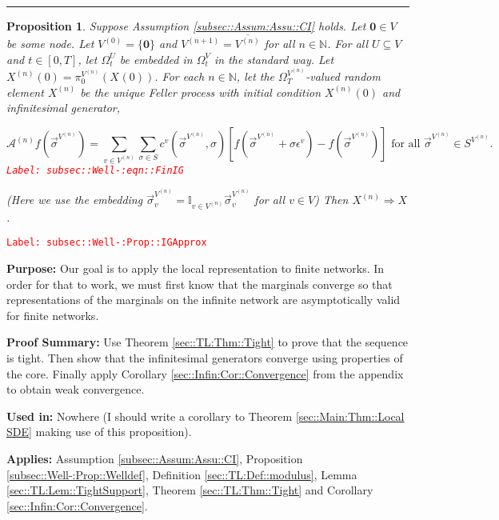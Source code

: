 \documentclass[12pt]{article}
\newcommand{\mb}{\mathbb}
\newcommand{\mc}{\mathcal}
\newcommand{\ov}{\overline}
\newcommand{\te}{\text}
\newcommand{\ep}{\epsilon}
\newcommand{\tr}{\textcolor{red}}
\newcommand{\labe}[1]{\tr{\texttt{Label: #1}}}
\newcommand{\purpose}{\textbf{Purpose: }}
\newcommand{\pfsum}{\textbf{Proof Summary: }}
\newcommand{\usein}{\textbf{Used in: }}
\newcommand{\app}{\textbf{Applies: }}
\newcommand{\lin}{\rule{\linewidth}{0.4 pt}}
\renewcommand{\root}{\mathbf{0}}				%
\renewcommand{\v}{v}							%
\renewcommand{\U}{U}							%
\renewcommand{\S}{S}							%
\newcommand{\s}{\sigma}							%
\newcommand{\sv}{\vec{\s}}						%
\newcommand{\ev}{\ep}							%
\newcommand{\T}{T}								%
\renewcommand{\t}{t}							%
\newcommand{\sset}{\Omega}						%
\newcommand{\proj}{\pi}							%
\newcommand{\X}{X}								%
\newcommand{\IG}{\mc{A}}						%
\newcommand{\IGr}{c}							%
\newcommand{\vind}[1]{^{#1}}					%
\newcommand{\carp}[1]{^{#1}}					%
\newcommand{\vsi}[1]{^{#1}}						%
\newcommand{\cind}[1]{_{#1}}					%
\newcommand{\cl}{\ov}							%
\newcommand{\tp}[1]{(#1)}						%
\newcommand{\tip}[1]{#1}						%
\newcommand{\ts}[1]{_{#1}}						%
\newcommand{\sln}[1]{^{(#1)}}					%
\newtheorem{prop}[thms]{Proposition}
\begin{document}
\lin

\begin{prop}
Suppose Assumption \ref{subsec::Assum:Assu::CI} holds. Let \(\root \in V\) be some node. Let \(V\sln{0} = \{\root\}\) and \(V\sln{n+1} = \cl{V\sln{n}}\) for all \(n \in \mb{N}\). For all \(\U \subseteq V\) and \(\t \in [0,\T]\), let \(\sset\vsi{\U}\ts{\t}\) be embedded in \(\sset\vsi{V}\ts{\t}\) in the standard way. Let \(\X\sln{n}\cind{}\tp{0} = \proj\vsi{V\sln{n}}\ts{0}(\X\cind{}\tp{0})\). For each \(n\in\mb{N}\), let the \(\sset\vsi{V\sln{n}}\ts{\T}\)-valued random element \(\X\sln{n}\cind{}\tip{}\) be the unique Feller process with initial condition \(\X\sln{n}\cind{}\tp{0}\) and infinitesimal generator,

\begin{equation}
\IG\sln{n}f(\sv\cind{}\vsi{V\sln{n}}) = \sum_{\v\in V\sln{n}}\sum_{\s\in \S} \IGr\vind{\v}(\sv\cind{}\vsi{V\sln{n}}, \s)[f(\sv\cind{}\vsi{V\sln{n}} + \s\ev\vind{\v}) - f(\sv\cind{}\vsi{V\sln{n}})]\te{ for all } \sv\cind{}\vsi{V\sln{n}} \in \S\carp{V\sln{n}}.
\label{subsec::Well-:eqn::FinIG}
\end{equation}
\labe{subsec::Well-:eqn::FinIG}

(Here we use the embedding \(\sv\cind{\v}\vsi{V\sln{n}} = \mb{I}_{\v\in V\sln{n}} \sv\cind{\v}\vsi{V\sln{n}}\) for all \(\v \in V\)) Then \(\X\sln{n}\cind{}\tip{} \Rightarrow \X\cind{}\tip{}\).
\label{subsec::Well-:Prop::IGApprox}
\end{prop}
\labe{subsec::Well-:Prop::IGApprox}

\purpose Our goal is to apply the local representation to finite networks. In order for that to work, we must first know that the marginals converge so that representations of the marginals on the infinite network are asymptotically valid for finite networks.

\pfsum Use Theorem \ref{sec::TL:Thm::Tight} to prove that the sequence is tight. Then show that the infinitesimal generators converge using properties of the core. Finally apply Corollary \ref{sec::Infin:Cor::Convergence} from the appendix to obtain weak convergence.

\usein Nowhere (I should write a corollary to Theorem \ref{sec::Main:Thm::Local SDE} making use of this proposition).

\app Assumption \ref{subsec::Assum:Assu::CI}, Proposition \ref{subsec::Well-:Prop::Welldef}, Definition \ref{sec::TL:Def::modulus}, Lemma \ref{sec::TL:Lem::TightSupport}, Theorem \ref{sec::TL:Thm::Tight} and Corollary \ref{sec::Infin:Cor::Convergence}.
\end{document}

